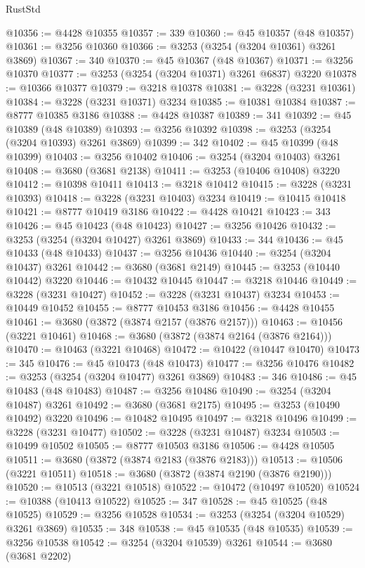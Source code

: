 \begin{lexlean}{RustStd}
\begin{coremodule}
@10356 := @4428 @10355
@10357 := 339
@10360 := @45 @10357 (@48 @10357)
@10361 := @3256 @10360
@10366 := @3253 (@3254 (@3204 @10361) @3261 @3869)
@10367 := 340
@10370 := @45 @10367 (@48 @10367)
@10371 := @3256 @10370
@10377 := @3253 (@3254 (@3204 @10371) @3261 @6837) @3220
@10378 := @10366 @10377
@10379 := @3218 @10378
@10381 := @3228 (@3231 @10361)
@10384 := @3228 (@3231 @10371) @3234
@10385 := @10381 @10384
@10387 := @8777 @10385 @3186
@10388 := @4428 @10387
@10389 := 341
@10392 := @45 @10389 (@48 @10389)
@10393 := @3256 @10392
@10398 := @3253 (@3254 (@3204 @10393) @3261 @3869)
@10399 := 342
@10402 := @45 @10399 (@48 @10399)
@10403 := @3256 @10402
@10406 := @3254 (@3204 @10403) @3261
@10408 := @3680 (@3681 @2138)
@10411 := @3253 (@10406 @10408) @3220
@10412 := @10398 @10411
@10413 := @3218 @10412
@10415 := @3228 (@3231 @10393)
@10418 := @3228 (@3231 @10403) @3234
@10419 := @10415 @10418
@10421 := @8777 @10419 @3186
@10422 := @4428 @10421
@10423 := 343
@10426 := @45 @10423 (@48 @10423)
@10427 := @3256 @10426
@10432 := @3253 (@3254 (@3204 @10427) @3261 @3869)
@10433 := 344
@10436 := @45 @10433 (@48 @10433)
@10437 := @3256 @10436
@10440 := @3254 (@3204 @10437) @3261
@10442 := @3680 (@3681 @2149)
@10445 := @3253 (@10440 @10442) @3220
@10446 := @10432 @10445
@10447 := @3218 @10446
@10449 := @3228 (@3231 @10427)
@10452 := @3228 (@3231 @10437) @3234
@10453 := @10449 @10452
@10455 := @8777 @10453 @3186
@10456 := @4428 @10455
@10461 := @3680 (@3872 (@3874 @2157 (@3876 @2157)))
@10463 := @10456 (@3221 @10461)
@10468 := @3680 (@3872 (@3874 @2164 (@3876 @2164)))
@10470 := @10463 (@3221 @10468)
@10472 := @10422 (@10447 @10470)
@10473 := 345
@10476 := @45 @10473 (@48 @10473)
@10477 := @3256 @10476
@10482 := @3253 (@3254 (@3204 @10477) @3261 @3869)
@10483 := 346
@10486 := @45 @10483 (@48 @10483)
@10487 := @3256 @10486
@10490 := @3254 (@3204 @10487) @3261
@10492 := @3680 (@3681 @2175)
@10495 := @3253 (@10490 @10492) @3220
@10496 := @10482 @10495
@10497 := @3218 @10496
@10499 := @3228 (@3231 @10477)
@10502 := @3228 (@3231 @10487) @3234
@10503 := @10499 @10502
@10505 := @8777 @10503 @3186
@10506 := @4428 @10505
@10511 := @3680 (@3872 (@3874 @2183 (@3876 @2183)))
@10513 := @10506 (@3221 @10511)
@10518 := @3680 (@3872 (@3874 @2190 (@3876 @2190)))
@10520 := @10513 (@3221 @10518)
@10522 := @10472 (@10497 @10520)
@10524 := @10388 (@10413 @10522)
@10525 := 347
@10528 := @45 @10525 (@48 @10525)
@10529 := @3256 @10528
@10534 := @3253 (@3254 (@3204 @10529) @3261 @3869)
@10535 := 348
@10538 := @45 @10535 (@48 @10535)
@10539 := @3256 @10538
@10542 := @3254 (@3204 @10539) @3261
@10544 := @3680 (@3681 @2202)

\end{coremodule}
\end{lexlean}
